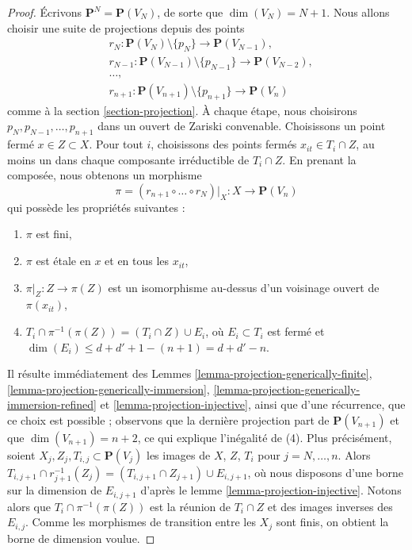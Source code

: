 \begin{proof}
Écrivons $\mathbf{P}^N = \mathbf{P}(V_N)$, de sorte que $\dim(V_N) = N + 1$.
Nous allons choisir une suite de projections depuis des points
\begin{align*}
& r_N : 
\mathbf{P}(V_N) \setminus \{p_N\} \to \mathbf{P}(V_{N - 1}), \\
& r_{N - 1} :
\mathbf{P}(V_{N - 1}) \setminus \{p_{N - 1}\} \to \mathbf{P}(V_{N - 2}), \\
& \ldots,\\
& r_{n + 1} :
\mathbf{P}(V_{n + 1}) \setminus \{p_{n + 1}\} \to \mathbf{P}(V_n)
\end{align*}
comme à la section \ref{section-projection}. À chaque étape, nous choisirons
$p_N, p_{N - 1}, \ldots, p_{n + 1}$ dans un ouvert de Zariski convenable.
Choisissons un point fermé $x \in Z \subset X$. Pour tout $i$, choisissons des
points fermés $x_{it} \in T_i \cap Z$, au moins un dans chaque composante irréductible
de $T_i \cap Z$. En prenant la composée, nous obtenons
un morphisme
$$
\pi = (r_{n + 1} \circ \ldots \circ r_N)|_X :
X \longrightarrow \mathbf{P}(V_n)
$$
qui possède les propriétés suivantes :
\begin{enumerate}
\item $\pi$ est fini,
\item $\pi$ est \'etale en $x$ et en tous les $x_{it}$,
\item $\pi|_Z : Z \to \pi(Z)$ est un isomorphisme
au-dessus d'un voisinage ouvert de $\pi(x_{it})$,
\item $T_i \cap \pi^{-1}(\pi(Z)) = (T_i \cap Z) \cup E_i$, où
$E_i \subset T_i$ est fermé et
$\dim(E_i) \leq d + d' + 1 - (n + 1) = d + d' - n$.
\end{enumerate}
Il résulte immédiatement des
Lemmes \ref{lemma-projection-generically-finite},
\ref{lemma-projection-generically-immersion},
\ref{lemma-projection-generically-immersion-refined} et
\ref{lemma-projection-injective}, ainsi que d'une récurrence, que ce choix est possible ;
observons que la dernière projection part de $\mathbf{P}(V_{n + 1})$ et que
$\dim(V_{n + 1}) = n + 2$, ce qui explique l'inégalité de (4). Plus
précisément, soient $X_j, Z_j, T_{i, j} \subset \mathbf{P}(V_j)$ les images
de $X$, $Z$, $T_i$ pour $j = N, \ldots, n$. Alors
$T_{i, j + 1} \cap r_{j + 1}^{-1}(Z_j) = (T_{i, j + 1} \cap Z_{j + 1})
\cup E_{i, j + 1}$, où nous disposons d'une borne sur la dimension de $E_{i, j + 1}$
d'après le lemme \ref{lemma-projection-injective}. Notons alors que
$T_i \cap \pi^{-1}(\pi(Z))$ est la réunion de $T_i \cap Z$
et des images inverses des $E_{i, j}$. Comme les morphismes de transition
entre les $X_j$ sont finis, on obtient la borne de dimension voulue.


\end{proof}
